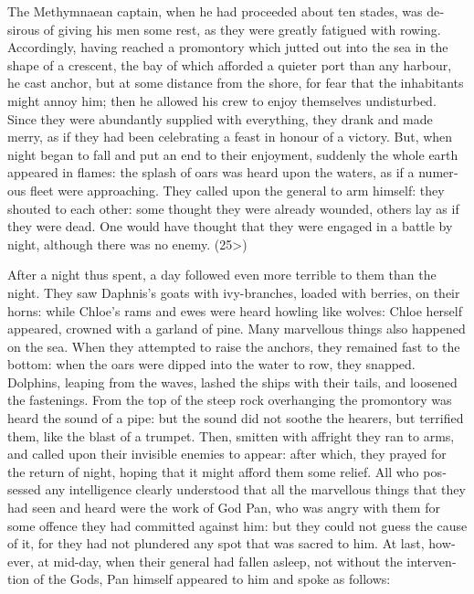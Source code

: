 \documentclass{book}
\begin{document}
\begin{pairs}
\begin{Rightside}
\begin{english}
  The Methymnaean captain, when he had proceeded about ten stades, was desirous of giving his men some rest, as they were greatly fatigued with rowing.  Accordingly, having reached a promontory which jutted out into the sea in the shape of a crescent, the bay of which afforded a quieter port than any harbour, he cast anchor, but at some distance from the shore, for fear that the inhabitants might annoy him; then he allowed his crew to enjoy themselves undisturbed.  Since they were abundantly supplied with everything, they drank and made merry, as if they had been celebrating a feast in honour of a victory.  But, when night began to fall and put an end to their enjoyment, suddenly the whole earth appeared in flames: the splash of oars was heard upon the waters, as if a numerous fleet were approaching.  They called upon the general to arm himself: they shouted to each other: some thought they were already wounded, others lay as if they were dead.  One would have thought that they were engaged in a battle by night, although there was no enemy.  (25>)
\pend


  After a night thus spent, a day followed even more terrible to them than the night.  They saw Daphnis's goats with ivy-branches, loaded with berries, on their horns: while Chloe's rams and ewes were heard howling like wolves: Chloe herself appeared, crowned with a garland of pine.  Many marvellous things also happened on the sea.  When they attempted to raise the anchors, they remained fast to the bottom: when the oars were dipped into the water to row, they snapped.  Dolphins, leaping from the waves, lashed the ships with their tails, and loosened the fastenings.  From the top of the steep rock overhanging the promontory was heard the sound of a pipe: but the sound did not soothe the hearers, but terrified them, like the blast of a trumpet.  Then, smitten with affright they ran to arms, and called upon their invisible enemies to appear: after which, they prayed for the return of night, hoping that it might afford them some relief.  All who possessed any intelligence clearly understood that all the marvellous things that they had seen and heard were the work of God Pan, who was angry with them for some offence they had committed against him: but they could not guess the cause of it, for they had not plundered any spot that was sacred to him.  At last, however, at mid-day, when their general had fallen asleep, not without the intervention of the Gods, Pan himself appeared to him and spoke as follows:
\pend



\end{english}
\end{Rightside}
\end{pairs}
\end{document}
